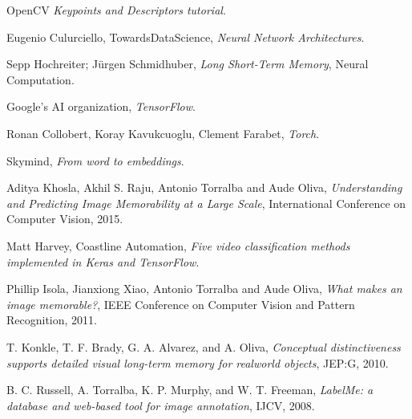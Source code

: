 \begin{thebibliography}{}
	OpenCV
	\emph{Keypoints and Descriptors tutorial}.


	Eugenio Culurciello, TowardsDataScience,
	\emph{Neural Network Architectures}.

	Sepp Hochreiter; Jürgen Schmidhuber,
	\emph{Long Short-Term Memory},
	Neural Computation.

	Google’s AI organization,
	\emph{TensorFlow}.


	Ronan Collobert, Koray Kavukcuoglu, Clement Farabet,
    \emph{Torch}.

	Skymind,
    \emph{From word to embeddings}.

	Aditya Khosla, Akhil S. Raju, Antonio Torralba and Aude Oliva,
	\emph{Understanding and Predicting Image Memorability at a Large Scale},
	International Conference on Computer Vision,
	2015.

	Matt Harvey, Coastline Automation,
	\emph{Five video classification methods implemented in Keras and TensorFlow}.

	Phillip Isola, Jianxiong Xiao, Antonio Torralba and Aude Oliva,
	\emph{What makes an image memorable?},
	IEEE Conference on Computer Vision and Pattern Recognition,
	2011.

	T. Konkle, T. F. Brady, G. A. Alvarez, and A. Oliva,
	\emph{Conceptual distinctiveness supports detailed visual long-term memory for realworld objects},
	JEP:G, 2010.

	B. C. Russell, A. Torralba, K. P. Murphy, and W. T. Freeman,
	\emph{LabelMe: a database and web-based tool for image annotation},
	IJCV, 2008.


\end{thebibliography}